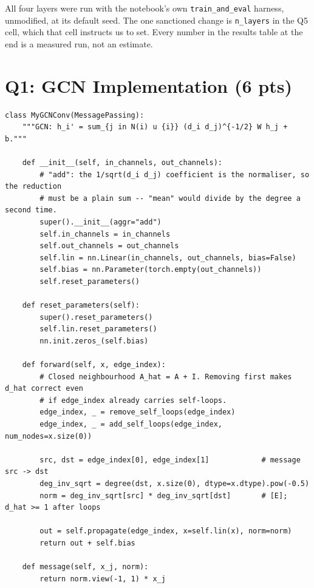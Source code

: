 

All four layers were run with the notebook's own \texttt{train\_and\_eval} harness,
unmodified, at its default seed. The one sanctioned change is \texttt{n\_layers} in
the Q5 cell, which that cell instructs us to set. Every number in the results table at
the end is a measured run, not an estimate.

\section*{Q1: GCN Implementation (6 pts)}

\begin{lstlisting}[style=p1pystyle]
class MyGCNConv(MessagePassing):
    """GCN: h_i' = sum_{j in N(i) u {i}} (d_i d_j)^{-1/2} W h_j + b."""

    def __init__(self, in_channels, out_channels):
        # "add": the 1/sqrt(d_i d_j) coefficient is the normaliser, so the reduction
        # must be a plain sum -- "mean" would divide by the degree a second time.
        super().__init__(aggr="add")
        self.in_channels = in_channels
        self.out_channels = out_channels
        self.lin = nn.Linear(in_channels, out_channels, bias=False)
        self.bias = nn.Parameter(torch.empty(out_channels))
        self.reset_parameters()

    def reset_parameters(self):
        super().reset_parameters()
        self.lin.reset_parameters()
        nn.init.zeros_(self.bias)

    def forward(self, x, edge_index):
        # Closed neighbourhood A_hat = A + I. Removing first makes d_hat correct even
        # if edge_index already carries self-loops.
        edge_index, _ = remove_self_loops(edge_index)
        edge_index, _ = add_self_loops(edge_index, num_nodes=x.size(0))

        src, dst = edge_index[0], edge_index[1]            # message src -> dst
        deg_inv_sqrt = degree(dst, x.size(0), dtype=x.dtype).pow(-0.5)
        norm = deg_inv_sqrt[src] * deg_inv_sqrt[dst]       # [E]; d_hat >= 1 after loops

        out = self.propagate(edge_index, x=self.lin(x), norm=norm)
        return out + self.bias

    def message(self, x_j, norm):
        return norm.view(-1, 1) * x_j
\end{lstlisting}

